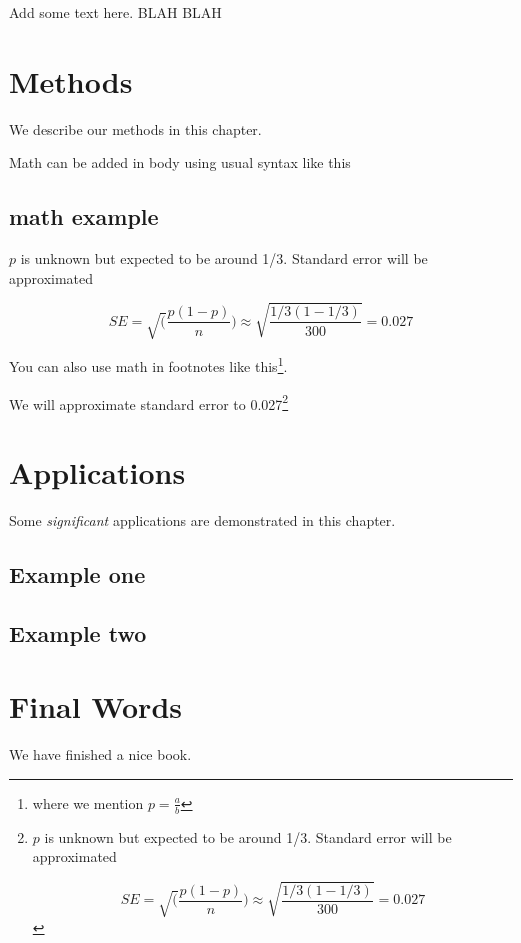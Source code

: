 \documentclass[
]{book}
\begin{document}
Add some text here. BLAH BLAH

\hypertarget{methods}{%
\chapter{Methods}\label{methods}}

We describe our methods in this chapter.

Math can be added in body using usual syntax like this

\hypertarget{math-example}{%
\section{math example}\label{math-example}}

\(p\) is unknown but expected to be around 1/3. Standard error will be approximated

\[
SE = \sqrt(\frac{p(1-p)}{n}) \approx \sqrt{\frac{1/3 (1 - 1/3)} {300}} = 0.027
\]

You can also use math in footnotes like this\footnote{where we mention \(p = \frac{a}{b}\)}.

We will approximate standard error to 0.027\footnote{\(p\) is unknown but expected to be around 1/3. Standard error will be approximated

  \[
  SE = \sqrt(\frac{p(1-p)}{n}) \approx \sqrt{\frac{1/3 (1 - 1/3)} {300}} = 0.027
  \]}

\hypertarget{applications}{%
\chapter{Applications}\label{applications}}

Some \emph{significant} applications are demonstrated in this chapter.

\hypertarget{example-one}{%
\section{Example one}\label{example-one}}

\hypertarget{example-two}{%
\section{Example two}\label{example-two}}

\hypertarget{final-words}{%
\chapter{Final Words}\label{final-words}}

We have finished a nice book.

  
\end{document}
